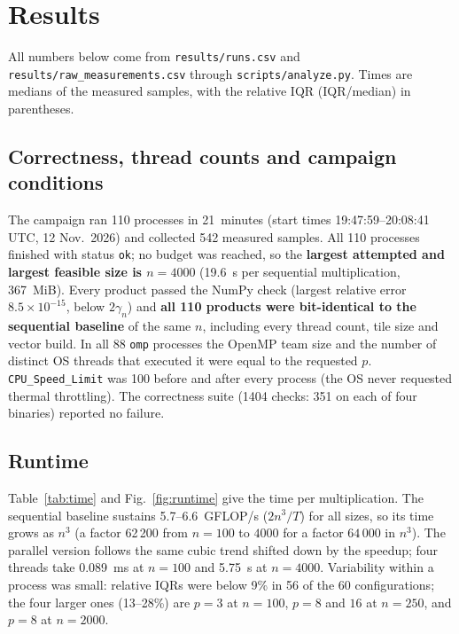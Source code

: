 \section{Results}
All numbers below come from \texttt{results/runs.csv} and \texttt{results/raw\_measurements.csv} through \texttt{scripts/analyze.py}.
Times are medians of the measured samples, with the relative IQR (IQR/median) in parentheses.

\subsection{Correctness, thread counts and campaign conditions}
The campaign ran 110 processes in 21~minutes (start times 19:47:59--20:08:41 UTC, 12 Nov.~2026) and collected 542 measured samples. All
110 processes finished with status \texttt{ok}; no budget was reached, so the \textbf{largest attempted and largest feasible size is
$n=4000$} (19.6~s per sequential multiplication, 367~MiB). Every product passed the NumPy check (largest relative error
$8.5\times10^{-15}$, below $2\gamma_n$) and \textbf{all 110 products were bit-identical to the sequential baseline} of the same $n$,
including every thread count, tile size and vector build. In all 88 \texttt{omp} processes the OpenMP team size and the number of
distinct OS threads that executed it were equal to the requested $p$. \texttt{CPU\_Speed\_Limit} was 100 before and after every
process (the OS never requested thermal throttling). The correctness suite (1404 checks: 351 on each of four binaries) reported no failure.

\subsection{Runtime}
Table~\ref{tab:time} and Fig.~\ref{fig:runtime} give the time per multiplication. The sequential baseline sustains 5.7--6.6~GFLOP/s
($2n^3/T$) for all sizes, so its time grows as $n^3$ (a factor 62\,200 from $n=100$ to $4000$ for a factor $64\,000$ in $n^3$). The parallel
version follows the same cubic trend shifted down by the speedup; four threads take 0.089~ms at $n=100$ and 5.75~s at $n=4000$.
Variability within a process was small: relative IQRs were below 9\% in 56 of the 60 configurations; the four larger ones (13--28\%) are $p=3$ at $n=100$, $p=8$ and $16$ at
$n=250$, and $p=8$ at $n=2000$.

\begin{table}[!htb]\centering\footnotesize\setlength{\tabcolsep}{3pt}
\caption{Time per multiplication, median (relative IQR) of 5 measured samples (3 at $n=4000$); campaigns \texttt{main} and \texttt{large}.
Batches of 607, 39 and 5 multiplications for $n=100,250,500$. ``--'': not planned. $p=16$ is oversubscribed (8 hardware threads).}
\label{tab:time}\resizebox{\linewidth}{!}{}
\end{table}

